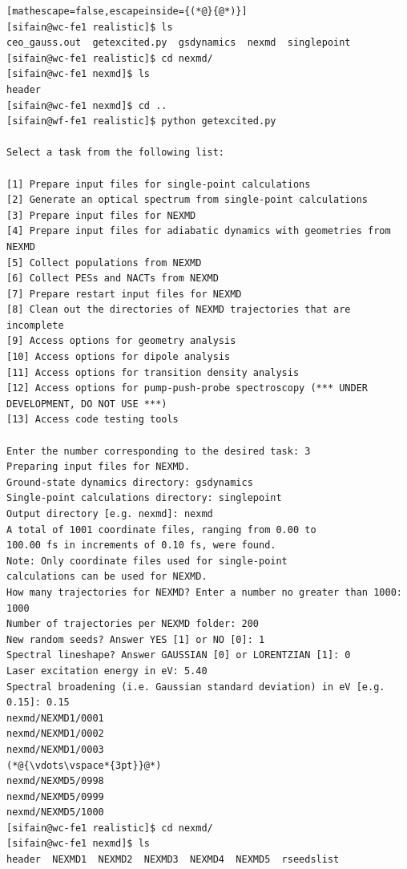 \documentclass[letterpaper,12pt,titlepage]{article}
\begin{document}
\begin{lstlisting}[mathescape=false,escapeinside={(*@}{@*)}]
[sifain@wc-fe1 realistic]$ ls
ceo_gauss.out  getexcited.py  gsdynamics  nexmd  singlepoint
[sifain@wc-fe1 realistic]$ cd nexmd/
[sifain@wc-fe1 nexmd]$ ls
header
[sifain@wc-fe1 nexmd]$ cd ..
[sifain@wf-fe1 realistic]$ python getexcited.py 

Select a task from the following list:

[1] Prepare input files for single-point calculations
[2] Generate an optical spectrum from single-point calculations
[3] Prepare input files for NEXMD
[4] Prepare input files for adiabatic dynamics with geometries from NEXMD
[5] Collect populations from NEXMD
[6] Collect PESs and NACTs from NEXMD
[7] Prepare restart input files for NEXMD
[8] Clean out the directories of NEXMD trajectories that are incomplete
[9] Access options for geometry analysis
[10] Access options for dipole analysis
[11] Access options for transition density analysis
[12] Access options for pump-push-probe spectroscopy (*** UNDER DEVELOPMENT, DO NOT USE ***)
[13] Access code testing tools

Enter the number corresponding to the desired task: 3
Preparing input files for NEXMD.
Ground-state dynamics directory: gsdynamics
Single-point calculations directory: singlepoint
Output directory [e.g. nexmd]: nexmd 
A total of 1001 coordinate files, ranging from 0.00 to 
100.00 fs in increments of 0.10 fs, were found.
Note: Only coordinate files used for single-point 
calculations can be used for NEXMD.
How many trajectories for NEXMD? Enter a number no greater than 1000: 1000
Number of trajectories per NEXMD folder: 200
New random seeds? Answer YES [1] or NO [0]: 1
Spectral lineshape? Answer GAUSSIAN [0] or LORENTZIAN [1]: 0
Laser excitation energy in eV: 5.40
Spectral broadening (i.e. Gaussian standard deviation) in eV [e.g. 0.15]: 0.15
nexmd/NEXMD1/0001
nexmd/NEXMD1/0002
nexmd/NEXMD1/0003
(*@{\vdots\vspace*{3pt}}@*)
nexmd/NEXMD5/0998
nexmd/NEXMD5/0999
nexmd/NEXMD5/1000
[sifain@wc-fe1 realistic]$ cd nexmd/
[sifain@wc-fe1 nexmd]$ ls
header  NEXMD1  NEXMD2  NEXMD3  NEXMD4  NEXMD5  rseedslist
\end{lstlisting}
\end{document}
